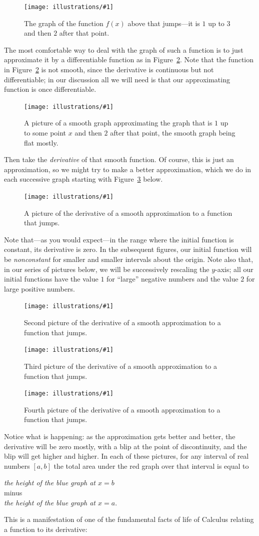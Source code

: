 \documentclass[openany]{book}
\newcommand{\ill}[3]{%
   \begin{figure}[H]%
   \vspace{-2ex}
   \centering%
   \texttt{[image: illustrations/\#1]}%
   \caption{#3}%
   \vspace{-2ex}
    \end{figure}}
\theoremstyle{plain}
\theoremstyle{definition}
\begin{document}
\ill{jump}{0.5}{The graph of the function $f(x)$ above that jumps---it is $1$ up to $3$ and then $2$ after that point.\label{fig:jump}}


The most comfortable way to deal with the graph of such a function is
to just approximate it by a differentiable function as in
Figure~\ref{fig:jumpsmooth}.  Note that the function in
Figure~\ref{fig:jumpsmooth} is not smooth, since the
derivative is continuous but not differentiable; in our
discussion all
we will need is that our approximating function is once
differentiable.


\ill{jump-smooth}{0.5}{A picture of a smooth graph approximating the
  graph that is $1$ up to some point $x$ and then $2$ after that
  point, the smooth graph being flat mostly.\label{fig:jumpsmooth}}


Then take the {\em derivative} of that smooth function.  Of course,
this is just an approximation, so we might try to make a better
approximation, which we do in each successive graph starting
with Figure~\ref{fig:djump1} below.


\ill{jump-smooth-deriv-7}{0.6}{A picture of the derivative of
a smooth approximation to a function that jumps.\label{fig:djump1}}

Note that---as you would expect---in the range where the initial
function is constant, its derivative is zero. In the subsequent
figures, our initial function will be {\it nonconstant} for smaller
and smaller intervals about the origin. Note also that, in our series
of pictures below, we will be successively rescaling the $y$-axis; all
our initial functions have the value $1$ for ``large'' negative numbers
and the value $2$ for large positive numbers.

\ill{jump-smooth-deriv-2}{0.5}{Second picture of the derivative of
a smooth approximation to a function that jumps.\label{fig:djump2}}
\ill{jump-smooth-deriv-05}{0.5}{Third picture of the derivative of
a smooth approximation to a function that jumps.\label{fig:djump3}}
\ill{jump-smooth-deriv-01}{0.5}{Fourth picture of the derivative of
a smooth approximation to a function that jumps.\label{fig:djump4}}


Notice what is happening: as the approximation gets better and
better, the derivative will be zero mostly, with a blip at the point
of discontinuity, and the blip will get higher and higher.
In each of these pictures,  for any interval of real numbers $[a,b]$ the total area under the red graph over that interval is equal to
\begin{center}
{\it the height of the blue graph at $x=b$}\\
minus\\
{\it  the height of the blue graph  at $x=a$}.
\end{center}
This is a manifestation of one of the fundamental facts of life of
Calculus relating a function to its derivative:
\end{document}
